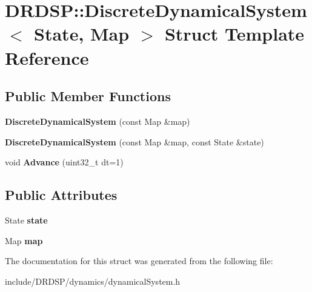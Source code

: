 \hypertarget{struct_d_r_d_s_p_1_1_discrete_dynamical_system}{\section{D\-R\-D\-S\-P\-:\-:Discrete\-Dynamical\-System$<$ State, Map $>$ Struct Template Reference}
\label{struct_d_r_d_s_p_1_1_discrete_dynamical_system}
}
\subsection*{Public Member Functions}
\begin{DoxyCompactItemize}
\item 
\hypertarget{struct_d_r_d_s_p_1_1_discrete_dynamical_system_ad3f73c7a93a088ec169a7c351805abe0}{{\bfseries Discrete\-Dynamical\-System} (const Map \&map)}\label{struct_d_r_d_s_p_1_1_discrete_dynamical_system_ad3f73c7a93a088ec169a7c351805abe0}

\item 
\hypertarget{struct_d_r_d_s_p_1_1_discrete_dynamical_system_afcaaef52db0707cd40b81c23c433d962}{{\bfseries Discrete\-Dynamical\-System} (const Map \&map, const State \&state)}\label{struct_d_r_d_s_p_1_1_discrete_dynamical_system_afcaaef52db0707cd40b81c23c433d962}

\item 
\hypertarget{struct_d_r_d_s_p_1_1_discrete_dynamical_system_ac2e23c5da942cd1f4b484b95ae0075d0}{void {\bfseries Advance} (uint32\-\_\-t dt=1)}\label{struct_d_r_d_s_p_1_1_discrete_dynamical_system_ac2e23c5da942cd1f4b484b95ae0075d0}

\end{DoxyCompactItemize}
\subsection*{Public Attributes}
\begin{DoxyCompactItemize}
\item 
\hypertarget{struct_d_r_d_s_p_1_1_discrete_dynamical_system_a297828d4508bddd152b048cb895daf79}{State {\bfseries state}}\label{struct_d_r_d_s_p_1_1_discrete_dynamical_system_a297828d4508bddd152b048cb895daf79}

\item 
\hypertarget{struct_d_r_d_s_p_1_1_discrete_dynamical_system_ac2e502e92cbdac8d46010d5249ba9de6}{Map {\bfseries map}}\label{struct_d_r_d_s_p_1_1_discrete_dynamical_system_ac2e502e92cbdac8d46010d5249ba9de6}

\end{DoxyCompactItemize}


The documentation for this struct was generated from the following file\-:\begin{DoxyCompactItemize}
\item 
include/\-D\-R\-D\-S\-P/dynamics/dynamical\-System.\-h\end{DoxyCompactItemize}
